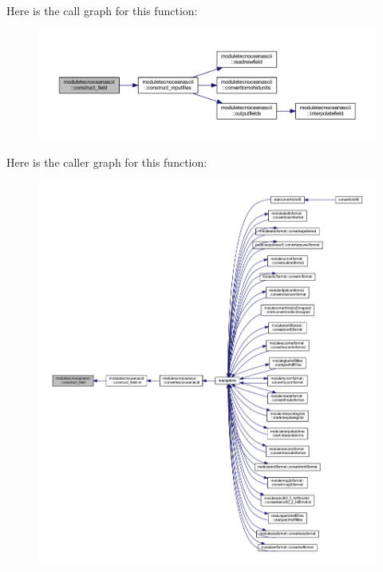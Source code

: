 Here is the call graph for this function\+:\nopagebreak
\begin{figure}[H]
\begin{center}
\leavevmode
\includegraphics[width=350pt]{namespacemoduletecnoceanascii_a5faf63426f042e591c210443525285aa_cgraph}
\end{center}
\end{figure}
Here is the caller graph for this function\+:\nopagebreak
\begin{figure}[H]
\begin{center}
\leavevmode
\includegraphics[width=350pt]{namespacemoduletecnoceanascii_a5faf63426f042e591c210443525285aa_icgraph}
\end{center}
\end{figure}
\mbox{\label{namespacemoduletecnoceanascii_af8c388a8fbef00e24b5198034a12ff26}} 
